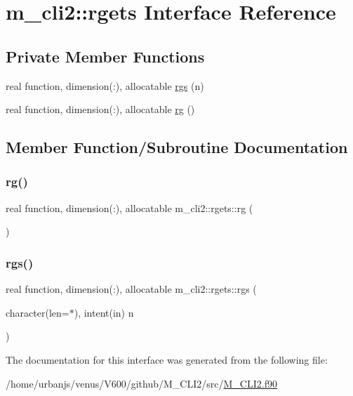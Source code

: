 \hypertarget{interfacem__cli2_1_1rgets}{}\section{m\+\_\+cli2\+:\+:rgets Interface Reference}
\label{interfacem__cli2_1_1rgets}
\subsection*{Private Member Functions}
\begin{DoxyCompactItemize}
\item 
real function, dimension(\+:), allocatable \mbox{\hyperlink{interfacem__cli2_1_1rgets_a6b663822725bf5cc080c27f9044abd2e}{rgs}} (n)
\item 
real function, dimension(\+:), allocatable \mbox{\hyperlink{interfacem__cli2_1_1rgets_a5c63301442aa696f026c0d890e0d8eda}{rg}} ()
\end{DoxyCompactItemize}


\subsection{Member Function/\+Subroutine Documentation}
\mbox{\label{interfacem__cli2_1_1rgets_a5c63301442aa696f026c0d890e0d8eda}} 
\subsubsection{\texorpdfstring{rg()}{rg()}}
{\footnotesize\ttfamily real function, dimension(\+:), allocatable m\+\_\+cli2\+::rgets\+::rg (\begin{DoxyParamCaption}{ }\end{DoxyParamCaption})\hspace{0.3cm}{\ttfamily [private]}}

\mbox{\label{interfacem__cli2_1_1rgets_a6b663822725bf5cc080c27f9044abd2e}} 
\subsubsection{\texorpdfstring{rgs()}{rgs()}}
{\footnotesize\ttfamily real function, dimension(\+:), allocatable m\+\_\+cli2\+::rgets\+::rgs (\begin{DoxyParamCaption}\item[{character(len=$\ast$), intent(in)}]{n }\end{DoxyParamCaption})\hspace{0.3cm}{\ttfamily [private]}}



The documentation for this interface was generated from the following file\+:\begin{DoxyCompactItemize}
\item 
/home/urbanjs/venus/\+V600/github/\+M\+\_\+\+C\+L\+I2/src/\mbox{\hyperlink{M__CLI2_8f90}{M\+\_\+\+C\+L\+I2.\+f90}}\end{DoxyCompactItemize}
